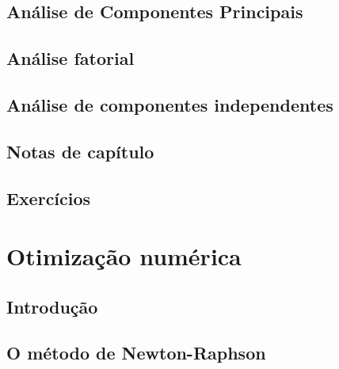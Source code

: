 \documentclass[
]{latex/krantz}
\theoremstyle{definition}
\theoremstyle{definition}
\theoremstyle{definition}
\theoremstyle{definition}
\theoremstyle{remark}
\begin{document}
\hypertarget{anuxe1lise-de-componentes-principais}{%
\section{Análise de Componentes Principais}\label{anuxe1lise-de-componentes-principais}}

\hypertarget{anuxe1lise-fatorial}{%
\section{Análise fatorial}\label{anuxe1lise-fatorial}}

\hypertarget{anuxe1lise-de-componentes-independentes}{%
\section{Análise de componentes independentes}\label{anuxe1lise-de-componentes-independentes}}

\hypertarget{notas-de-capuxedtulo-12}{%
\section{Notas de capítulo}\label{notas-de-capuxedtulo-12}}

\hypertarget{exercuxedcios-12}{%
\section{Exercícios}\label{exercuxedcios-12}}

\hypertarget{appendix-apuxeandices}{%
\appendix {}}


\hypertarget{otimizauxe7uxe3o-numuxe9rica}{%
\chapter{Otimização numérica}\label{otimizauxe7uxe3o-numuxe9rica}}

\hypertarget{introduuxe7uxe3o-13}{%
\section{Introdução}\label{introduuxe7uxe3o-13}}

\hypertarget{o-muxe9todo-de-newton-raphson}{%
\section{O método de Newton-Raphson}\label{o-muxe9todo-de-newton-raphson}}
\end{document}
